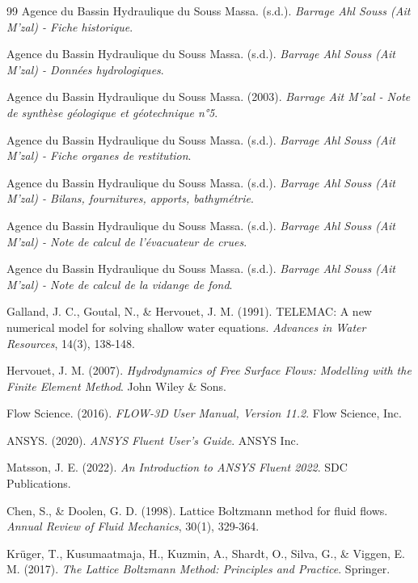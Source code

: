 \begin{thebibliography}{99}
Agence du Bassin Hydraulique du Souss Massa. (s.d.). \emph{Barrage Ahl Souss (Ait M'zal) - Fiche historique}.

Agence du Bassin Hydraulique du Souss Massa. (s.d.). \emph{Barrage Ahl Souss (Ait M'zal) - Données hydrologiques}.

Agence du Bassin Hydraulique du Souss Massa. (2003). \emph{Barrage Ait M'zal - Note de synthèse géologique et géotechnique n°5}.

Agence du Bassin Hydraulique du Souss Massa. (s.d.). \emph{Barrage Ahl Souss (Ait M'zal) - Fiche organes de restitution}.

Agence du Bassin Hydraulique du Souss Massa. (s.d.). \emph{Barrage Ahl Souss (Ait M'zal) - Bilans, fournitures, apports, bathymétrie}.

Agence du Bassin Hydraulique du Souss Massa. (s.d.). \emph{Barrage Ahl Souss (Ait M'zal) - Note de calcul de l'évacuateur de crues}.

Agence du Bassin Hydraulique du Souss Massa. (s.d.). \emph{Barrage Ahl Souss (Ait M'zal) - Note de calcul de la vidange de fond}.

Galland, J. C., Goutal, N., \& Hervouet, J. M. (1991). TELEMAC: A new numerical model for solving shallow water equations. \emph{Advances in Water Resources}, 14(3), 138-148.

Hervouet, J. M. (2007). \emph{Hydrodynamics of Free Surface Flows: Modelling with the Finite Element Method}. John Wiley \& Sons.

Flow Science. (2016). \emph{FLOW-3D User Manual, Version 11.2}. Flow Science, Inc.

ANSYS. (2020). \emph{ANSYS Fluent User's Guide}. ANSYS Inc.

Matsson, J. E. (2022). \emph{An Introduction to ANSYS Fluent 2022}. SDC Publications.

Chen, S., \& Doolen, G. D. (1998). Lattice Boltzmann method for fluid flows. \emph{Annual Review of Fluid Mechanics}, 30(1), 329-364.

Krüger, T., Kusumaatmaja, H., Kuzmin, A., Shardt, O., Silva, G., \& Viggen, E. M. (2017). \emph{The Lattice Boltzmann Method: Principles and Practice}. Springer.


\end{thebibliography}

